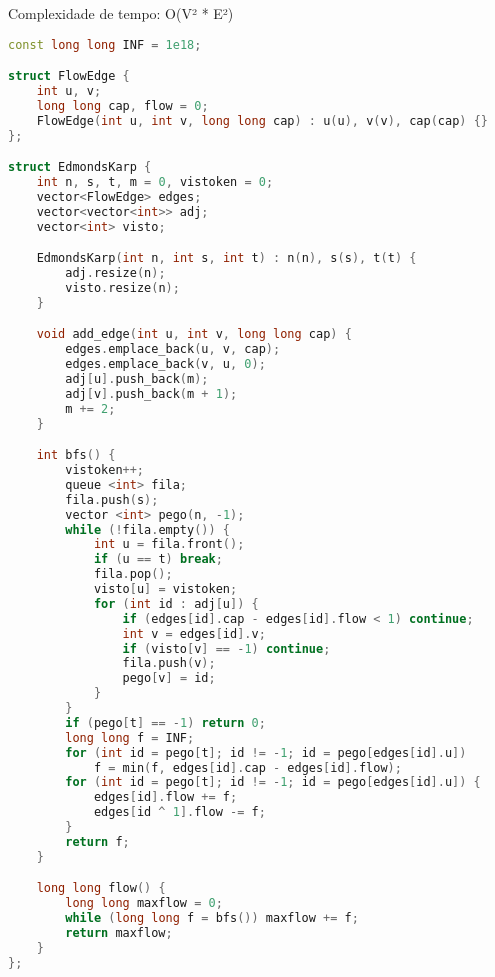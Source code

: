 \documentclass[11pt, a4paper, twoside]{article}
\begin{document}
Complexidade de tempo: O(V² * E²)

\begin{lstlisting}[language=C++]
const long long INF = 1e18;

struct FlowEdge {
    int u, v;
    long long cap, flow = 0;
    FlowEdge(int u, int v, long long cap) : u(u), v(v), cap(cap) {}
};

struct EdmondsKarp {
    int n, s, t, m = 0, vistoken = 0;
    vector<FlowEdge> edges;
    vector<vector<int>> adj;
    vector<int> visto;

    EdmondsKarp(int n, int s, int t) : n(n), s(s), t(t) {
        adj.resize(n);
        visto.resize(n);
    }

    void add_edge(int u, int v, long long cap) {
        edges.emplace_back(u, v, cap);
        edges.emplace_back(v, u, 0);
        adj[u].push_back(m);
        adj[v].push_back(m + 1);
        m += 2;
    }

    int bfs() {
        vistoken++;
        queue <int> fila;
        fila.push(s);
        vector <int> pego(n, -1);
        while (!fila.empty()) {
            int u = fila.front();
            if (u == t) break;
            fila.pop();
            visto[u] = vistoken;
            for (int id : adj[u]) {
                if (edges[id].cap - edges[id].flow < 1) continue;
                int v = edges[id].v;
                if (visto[v] == -1) continue;
                fila.push(v);
                pego[v] = id;
            }
        }
        if (pego[t] == -1) return 0;
        long long f = INF;
        for (int id = pego[t]; id != -1; id = pego[edges[id].u])
            f = min(f, edges[id].cap - edges[id].flow);
        for (int id = pego[t]; id != -1; id = pego[edges[id].u]) {
            edges[id].flow += f;
            edges[id ^ 1].flow -= f;
        }
        return f;
    }

    long long flow() {
        long long maxflow = 0;
        while (long long f = bfs()) maxflow += f;
        return maxflow;
    }
};
\end{lstlisting}
\end{document}
